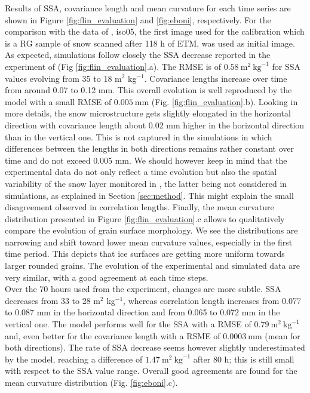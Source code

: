 \documentclass[draft,ms]{agujournal2019}
\begin{document}
Results of SSA, covariance length and mean curvature for each time series are shown in Figure \ref{fig:flin_evaluation} and \ref{fig:eboni}, respectively. For the comparison with the data of , iso05, the first image used for the calibration which is a RG sample of snow scanned after 118 h of ETM, was used as initial image.\\


As expected, simulations follow closely the SSA decrease reported in the experiment of  (Fig \ref{fig:flin_evaluation}.a).
The RMSE is of $0.58\ \mathrm{m}^2\ \mathrm{kg}^{-1}$ for SSA values evolving from 35 to 18 m$^2$ kg$^{-1}$.
Covariance lengths increase over time from around 0.07 to 0.12 mm. This overall evolution is well reproduced by the model with a small RMSE of $0.005\ \mathrm{mm}$ (Fig. \ref{fig:flin_evaluation}.b). Looking in more details, the snow microstructure gets slightly elongated in the horizontal direction with covariance length about 0.02 mm higher in the horizontal direction than in the vertical one. This is not captured in the simulations in which differences between the lengths in both directions remains rather constant over time and do not exceed 0.005 mm. We should however keep in mind that the experimental data do not only reflect a time evolution but also the spatial variability of the snow layer monitored in , the latter being not considered in simulations, as explained in Section \ref{sec:method}. This might explain the small disagreement observed in correlation lengths.
Finally, the mean curvature distribution presented in Figure \ref{fig:flin_evaluation}.c allows to qualitatively compare the evolution of grain surface morphology. We see the distributions are narrowing and shift toward lower mean curvature values, especially in the first time period. This depicts that ice surfaces are getting more uniform towards larger rounded grains. The evolution of the experimental and simulated data are very similar, with a good agreement at each time steps.\\



 Over the 70 hours used from the  experiment, changes are more subtle. SSA decreases from 33 to 28 m$^2$ kg$^{-1}$, whereas correlation length increases from 0.077 to 0.087 mm in the horizontal direction and from 0.065 to 0.072 mm in the vertical one. The model performs well for the SSA with a RMSE of $0.79\ \mathrm{m}^2\ \mathrm{kg}^{-1}$ and, even better for the covariance length with a RSME of $0.0003\ \mathrm{mm}$ (mean for both directions).
The rate of SSA decrease seems however slightly underestimated by the model, reaching a difference of $1.47\ \mathrm{m}^2\ \mathrm{kg}^{-1}$ after 80 h; this is still small with respect to the SSA value range.
Overall good agreements are found for the mean curvature distribution (Fig. \ref{fig:eboni}.c). \\
\end{document}
